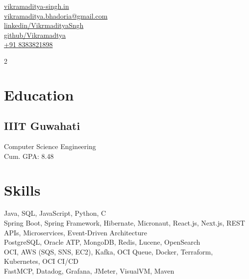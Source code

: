 \documentclass[]{hieudo-build}
\begin{document}
%
%
{
	\faGlobe \href{https://www.vikramaditya-singh.in}{ vikramaditya-singh.in} \\
	\faEnvelope \href{mailto:vikramaditya.bhadoria@gmail.com}{ vikramaditya.bhadoria@gmail.com} \\
	\faLinkedinSquare \href{https://www.linkedin.com/in/vikrmadityasngh/}{ linkedin/VikrmadityaSngh} \\
	\faGithub \href{https://github.com/Vikramadtya}{ github/Vikramadtya} \\
	\faPhone \href{tel:+918383821898}{ +91 8383821898}
}

\begin{paracol}{2}

%
%

\section{Education} 

\subsection{IIIT Guwahati}
Computer Science Engineering \\
Cum. GPA: 8.48\\
\sectionsep

\section{Skills}
Java, SQL, JavaScript, Python, C \\
Spring Boot, Spring Framework, Hibernate, Micronaut, React.js, Next.js, REST APIs, Microservices, Event-Driven Architecture \\
PostgreSQL, Oracle ATP, MongoDB, Redis, Lucene, OpenSearch \\
OCI, AWS (SQS, SNS, EC2), Kafka, OCI Queue, Docker, Terraform, Kubernetes, OCI CI/CD \\
FastMCP, Datadog, Grafana, JMeter, VisualVM, Maven \\
\sectionsep


\end{paracol}
\end{document}

